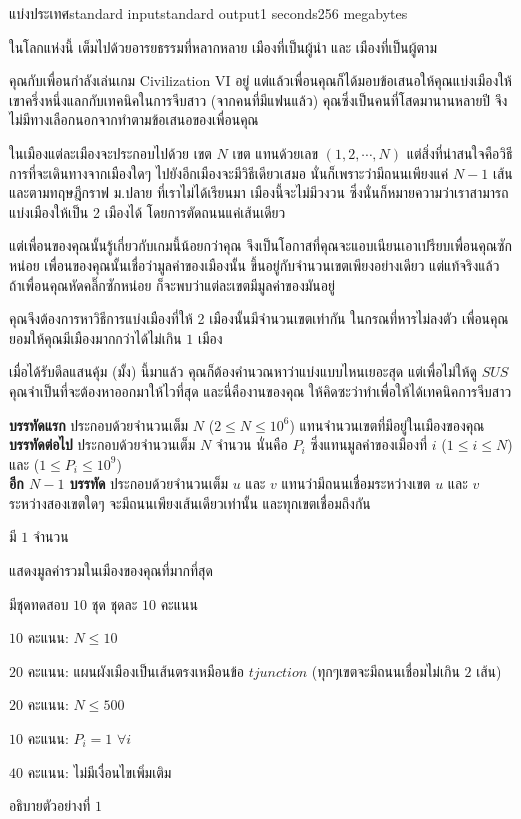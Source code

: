 \documentclass[11pt,a4paper]{article}
\begin{document}
\begin{problem}{แบ่งประเทศ}{standard input}{standard output}{1 seconds}{256 megabytes}

ในโลกแห่งนี้ เต็มไปด้วยอารยธรรมที่หลากหลาย เมืองที่เป็นผู้นำ และ เมืองที่เป็นผู้ตาม

คุณกับเพื่อนกำลังเล่นเกม Civilization VI อยู่ แต่แล้วเพื่อนคุณก็ได้มอบข้อเสนอให้คุณแบ่งเมืองให้เขาครึ่งหนึ่งแลกกับเทคนิคในการจีบสาว (จากคนที่มีแฟนแล้ว) คุณซึ่งเป็นคนที่โสดมานานหลายปี จึงไม่มีทางเลือกนอกจากทำตามข้อเสนอของเพื่อนคุณ

ในเมืองแต่ละเมืองจะประกอบไปด้วย เขต $N$ เขต แทนด้วยเลข $(1, 2, \cdots, N)$ แต่สิ่งที่น่าสนใจคือวิธีการที่จะเดินทางจากเมืองใดๆ ไปยังอีกเมืองจะมีวิธีเดียวเสมอ นั่นก็เพราะว่ามีถนนเพียงแค่ $N-1$ เส้น และตามทฤษฎีกราฟ ม.ปลาย ที่เราไม่ได้เรียนมา เมืองนี้จะไม่มีวงวน ซึ่งนั่นก็หมายความว่าเราสามารถแบ่งเมืองให้เป็น 2 เมืองได้ โดยการตัดถนนแค่เส้นเดียว

แต่เพื่อนของคุณนั้นรู้เกี่ยวกับเกมนี้น้อยกว่าคุณ จึงเป็นโอกาสที่คุณจะแอบเนียนเอาเปรียบเพื่อนคุณซักหน่อย เพื่อนของคุณนั้นเชื่อว่ามูลค่าของเมืองนั้น ขึ้นอยู่กับจำนวนเขตเพียงอย่างเดียว แต่แท้จริงแล้ว ถ้าเพื่อนคุณหัดคลิ๊กซักหน่อย ก็จะพบว่าแต่ละเขตมีมูลค่าของมันอยู่

คุณจึงต้องการหาวิธีการแบ่งเมืองที่ให้ 2 เมืองนั้นมีจำนวนเขตเท่ากัน ในกรณที่หารไม่ลงตัว เพื่อนคุณยอมให้คุณมีเมืองมากกว่าได้ไม่เกิน $1$ เมือง

เมื่อได้รับดีลแสนคุ้ม (มั้ง) นี้มาแล้ว คุณก็ต้องคำนวณหาว่าแบ่งแบบไหนเยอะสุด แต่เพื่อไม่ให้ดู $SUS$ คุณจำเป็นที่จะต้องหาออกมาให้ไวที่สุด และนี่คืองานของคุณ ให้คิดซะว่าทำเพื่อให้ได้เทคนิคการจีบสาว

\InputFile

\textbf{บรรทัดแรก} ประกอบด้วยจำนวนเต็ม $N$ ($2 \le N \le 10^6$) แทนจำนวนเขตที่มีอยู่ในเมืองของคุณ \\ 
\textbf{บรรทัดต่อไป} ประกอบด้วยจำนวนเต็ม $N$ จำนวน นั่นคือ $P_i$ ซึ่งแทนมูลค่าของเมืองที่ $i$ ($1 \le i \le N$) และ ($1 \le P_i \le 10^9$) \\
\textbf{อีก $N-1$ บรรทัด} ประกอบด้วยจำนวนเต็ม $u$ และ $v$ แทนว่ามีถนนเชื่อมระหว่างเขต $u$ และ $v$ ระหว่างสองเขตใดๆ จะมีถนนเพียงเส้นเดียวเท่านั้น และทุกเขตเชื่อมถึงกัน

\OutputFile

มี $1$ จำนวน

แสดงมูลค่ารวมในเมืองของคุณที่มากที่สุด

\Scoring
มีชุดทดสอบ $10$ ชุด ชุดละ $10$ คะแนน

$10$ คะแนน: $N \le 10$

$20$ คะแนน: แผนผังเมืองเป็นเส้นตรงเหมือนข้อ $tjunction$ (ทุกๆเขตจะมีถนนเชื่อมไม่เกิน $2$ เส้น)

$20$ คะแนน: $N \le 500$

$10$ คะแนน: $P_i = 1$  $\forall i$  

$40$ คะแนน: ไม่มีเงื่อนไขเพิ่มเติม

\Examples

\begin{example}
%
\end{example}

อธิบายตัวอย่างที่ $1$

\end{problem}
\end{document}
